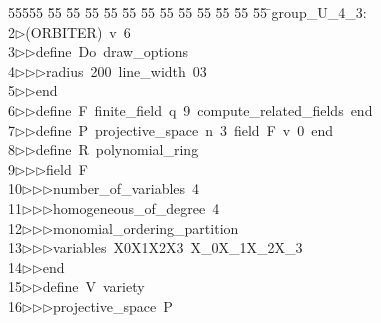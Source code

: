 %
%
\begin{tabbing}
55555 \= 55 \= 55 \= 55 \= 55 \= 55 \= 55 \= 55 \= 55 \= 55 \= 55 \= 55 \= 55 \= \>group\_U\_4\_3:\\[0pt]
2\>$\triangleright$\>(ORBITER)\ v\ 6\ \\[0pt]
3\>$\triangleright$\>$\triangleright$\>define\ Do\ draw\_options\ \\[0pt]
4\>$\triangleright$\>$\triangleright$\>$\triangleright$\>radius\ 200\ line\_width\ 03\ \\[0pt]
5\>$\triangleright$\>$\triangleright$\>end\ \\[0pt]
6\>$\triangleright$\>$\triangleright$\>define\ F\ finite\_field\ q\ 9\ compute\_related\_fields\ end\ \\[0pt]
7\>$\triangleright$\>$\triangleright$\>define\ P\ projective\_space\ n\ 3\ field\ F\ v\ 0\ end\ \\[0pt]
8\>$\triangleright$\>$\triangleright$\>define\ R\ polynomial\_ring\ \\[0pt]
9\>$\triangleright$\>$\triangleright$\>$\triangleright$\>field\ F\ \\[0pt]
10\>$\triangleright$\>$\triangleright$\>$\triangleright$\>number\_of\_variables\ 4\ \\[0pt]
11\>$\triangleright$\>$\triangleright$\>$\triangleright$\>homogeneous\_of\_degree\ 4\ \\[0pt]
12\>$\triangleright$\>$\triangleright$\>$\triangleright$\>monomial\_ordering\_partition\ \\[0pt]
13\>$\triangleright$\>$\triangleright$\>$\triangleright$\>variables\ X0X1X2X3\ X\_0X\_1X\_2X\_3\ \\[0pt]
14\>$\triangleright$\>$\triangleright$\>end\ \\[0pt]
15\>$\triangleright$\>$\triangleright$\>define\ V\ variety\ \\[0pt]
16\>$\triangleright$\>$\triangleright$\>$\triangleright$\>projective\_space\ P\ \\[0pt]

\end{tabbing}

